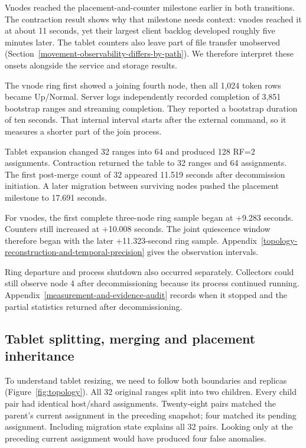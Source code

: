 Vnodes reached the placement-and-counter milestone earlier in both transitions. The contraction result shows why that milestone needs context: vnodes reached it at about 11 seconds, yet their largest client backlog developed roughly five minutes later. The tablet counters also leave part of file transfer unobserved (Section~\ref{movement-observability-differs-by-path}). We therefore interpret these onsets alongside the service and storage results.

The vnode ring first showed a joining fourth node, then all 1,024 token rows became Up/Normal. Server logs independently recorded completion of 3,851 bootstrap ranges and streaming completion. They reported a bootstrap duration of ten seconds. That internal interval starts after the external command, so it measures a shorter part of the join process.

Tablet expansion changed 32 ranges into 64 and produced 128 RF=2 assignments. Contraction returned the table to 32 ranges and 64 assignments. The first post-merge count of 32 appeared 11.519 seconds after decommission initiation. A later migration between surviving nodes pushed the placement milestone to 17.691 seconds.

For vnodes, the first complete three-node ring sample began at +9.283 seconds. Counters still increased at +10.008 seconds. The joint quiescence window therefore began with the later +11.323-second ring sample. Appendix~\ref{topology-reconstruction-and-temporal-precision} gives the observation intervals.

Ring departure and process shutdown also occurred separately. Collectors could still observe node 4 after decommissioning because its process continued running. Appendix~\ref{measurement-and-evidence-audit} records when it stopped and the partial statistics returned after decommissioning.

\hypertarget{tablet-splitting-merging-and-placement-inheritance}{%
\subsection{Tablet splitting, merging and placement
inheritance}\label{tablet-splitting-merging-and-placement-inheritance}}

To understand tablet resizing, we need to follow both boundaries and replicas (Figure~\ref{fig:topology}). All 32 original ranges split into two children. Every child pair had identical host/shard assignments. Twenty-eight pairs matched the parent's current assignment in the preceding snapshot; four matched its pending assignment. Including migration state explains all 32 pairs. Looking only at the preceding current assignment would have produced four false anomalies.

